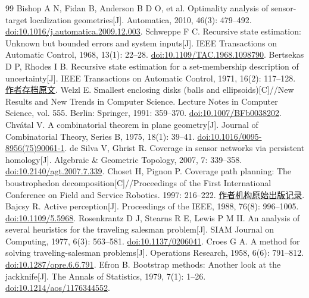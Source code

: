 \documentclass[UTF8,a4paper,zihao=-4,fontset=mac]{ctexart}
\begin{document}
\clearpage
\begin{thebibliography}{99}\small
{} Bishop A N, Fidan B, Anderson B D O, et al. Optimality analysis of sensor-target localization geometries[J]. Automatica, 2010, 46(3): 479--492. \href{https://doi.org/10.1016/j.automatica.2009.12.003}{doi:10.1016/j.automatica.2009.12.003}.
 Schweppe F C. Recursive state estimation: Unknown but bounded errors and system inputs[J]. IEEE Transactions on Automatic Control, 1968, 13(1): 22--28. \href{https://doi.org/10.1109/TAC.1968.1098790}{doi:10.1109/TAC.1968.1098790}.
 Bertsekas D P, Rhodes I B. Recursive state estimation for a set-membership description of uncertainty[J]. IEEE Transactions on Automatic Control, 1971, 16(2): 117--128. \href{https://web.mit.edu/dimitrib/www/RecursiveStateEstimation.pdf}{作者存档原文}.
 Welzl E. Smallest enclosing disks (balls and ellipsoids)[C]//New Results and New Trends in Computer Science. Lecture Notes in Computer Science, vol. 555. Berlin: Springer, 1991: 359--370. \href{https://doi.org/10.1007/BFb0038202}{doi:10.1007/BFb0038202}.
 Chvátal V. A combinatorial theorem in plane geometry[J]. Journal of Combinatorial Theory, Series B, 1975, 18(1): 39--41. \href{https://doi.org/10.1016/0095-8956(75)90061-1}{doi:10.1016/0095-8956(75)90061-1}.
 de Silva V, Ghrist R. Coverage in sensor networks via persistent homology[J]. Algebraic \& Geometric Topology, 2007, 7: 339--358. \href{https://doi.org/10.2140/agt.2007.7.339}{doi:10.2140/agt.2007.7.339}.
 Choset H, Pignon P. Coverage path planning: The boustrophedon decomposition[C]//Proceedings of the First International Conference on Field and Service Robotics. 1997: 216--222. \href{https://publications.ri.cmu.edu/coverage-path-planning-the-boustrophedon-decomposition}{作者机构原始出版记录}.
 Bajcsy R. Active perception[J]. Proceedings of the IEEE, 1988, 76(8): 996--1005. \href{https://doi.org/10.1109/5.5968}{doi:10.1109/5.5968}.
 Rosenkrantz D J, Stearns R E, Lewis P M II. An analysis of several heuristics for the traveling salesman problem[J]. SIAM Journal on Computing, 1977, 6(3): 563--581. \href{https://doi.org/10.1137/0206041}{doi:10.1137/0206041}.
 Croes G A. A method for solving traveling-salesman problems[J]. Operations Research, 1958, 6(6): 791--812. \href{https://doi.org/10.1287/opre.6.6.791}{doi:10.1287/opre.6.6.791}.
 Efron B. Bootstrap methods: Another look at the jackknife[J]. The Annals of Statistics, 1979, 7(1): 1--26. \href{https://doi.org/10.1214/aos/1176344552}{doi:10.1214/aos/1176344552}.
\end{thebibliography}
\end{document}
